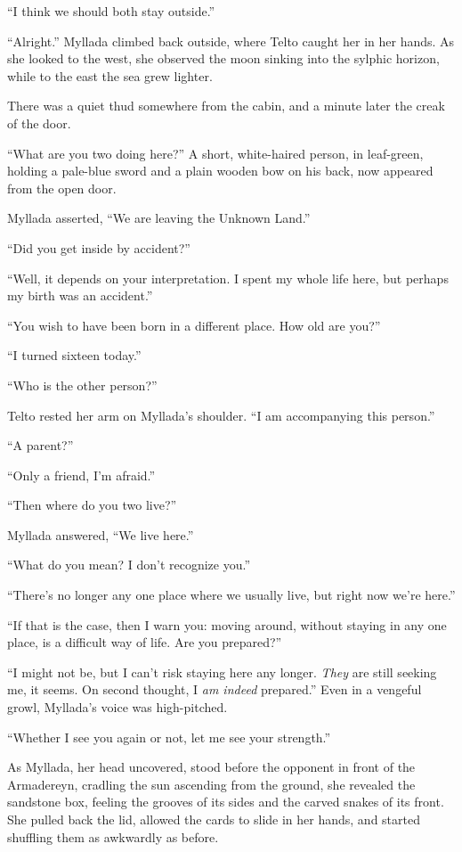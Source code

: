 ``I think we should both stay outside.''

``Alright.'' Myllada climbed back outside, where Telto caught her in her hands. As she looked to the west, she observed the moon sinking into the sylphic horizon, while to the east the sea grew lighter.

There was a quiet thud somewhere from the cabin, and a minute later the creak of the door.

``What are you two doing here?'' A short, white-haired person, in leaf-green, holding a pale-blue sword and a plain wooden bow on his back, now appeared from the open door.

Myllada asserted, ``We are leaving the Unknown Land.''

``Did you get inside by accident?''

``Well, it depends on your interpretation. I spent my whole life here, but perhaps my birth was an accident.''

``You wish to have been born in a different place. How old are you?''

``I turned sixteen today.''

``Who is the other person?''

Telto rested her arm on Myllada's shoulder. ``I am accompanying this person.''

``A parent?''

``Only a friend, I'm afraid.''

``Then where do you two live?''

Myllada answered, ``We live here.''

``What do you mean? I don't recognize you.''

``There's no longer any one place where we usually live, but right now we're here.''

``If that is the case, then I warn you: moving around, without staying in any one place, is a difficult way of life. Are you prepared?''

``I might not be, but I can't risk staying here any longer. \emph{They} are still seeking me, it seems. On second thought, I \emph{am indeed} prepared.'' Even in a vengeful growl, Myllada's voice was high-pitched.

``Whether I see you again or not, let me see your strength.''

\centeredstars

As Myllada, her head uncovered, stood before the opponent in front of the Armadereyn, cradling the sun ascending from the ground, she revealed the sandstone box, feeling the grooves of its sides and the carved snakes of its front. She pulled back the lid, allowed the cards to slide in her hands, and started shuffling them as awkwardly as before.

